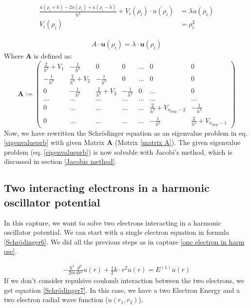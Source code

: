 \documentclass[10pt,a4paper]{article}
\begin{document}
\begin{align}
	\frac{u(\rho_i+h)-2u(\rho_i)+u(\rho_i-h)}{h^2}  + V_i(\rho_i) \cdot u(\rho_i) &= \lambda u(\rho_i) \label{Schrödinger5}\\
	V_i(\rho_i) &= \rho_i^2
\end{align}

\begin{align}
	A \cdot \mathbf{u}(\rho_i)  = \lambda \cdot \mathbf{u}(\rho_i) \label{eigenvalueprb}
\end{align}
Where $\mathbf{A}$ is defined as:
\begin{equation}
	\mathbf{A}:=  \left( \begin{array}{ccccccc} \frac{2}{h^2}+V_1 & -\frac{1}{h^2} & 0   & 0    & \dots  &0     & 0 \\
		-\frac{1}{h^2} & \frac{2}{h^2}+V_2 & -\frac{1}{h^2} & 0    & \dots  &0     &0 \\
		0   & -\frac{1}{h^2} & \frac{2}{h^2}+V_3 & -\frac{1}{h^2}  &0       &\dots & 0\\
		\dots  & \dots & \dots & \dots  &\dots      &\dots & \dots\\
		0   & \dots & \dots & \dots  &\dots       &\frac{2}{h^2}+V_{n_{\mathrm{step}}-2} & -\frac{1}{h^2}\\
		0   & \dots & \dots & \dots  &\dots       &-\frac{1}{h^2} & \frac{2}{h^2}+V_{n_{\mathrm{step}}-1}
		
	\end{array} \right)  \label{matrix A}
\end{equation} 
Now, we have rewritten the Schrödinger equation as an eigenvalue problem in eq. \eqref{eigenvalueprb} with given Matrix $\mathbf{A}$ (Matrix \ref{matrix A}). The given eigenvalue problem (eq. \eqref{eigenvalueprb}) is now solvable with Jacobi's method, which is discussed in section \ref{Jacobis method}.

\subsection{Two interacting electrons in a harmonic oscillator potential}

In this capture, we want to solve two electrons interacting in a harmonic oscillator potential.
We can start with a single electron equation in formula \ref{Schrödinger6}. We did all the previous steps as in capture  \ref{one electron in harm osc}. 

\begin{align}
	-\frac{\hbar^2}{2 m}  \frac{d^2}{dr^2} u(r)+ \frac{1}{2}k \cdot r^2 u(r)= E^{(1)} u(r) \label{Schrödinger6}
\end{align}
If we don't consider repulsive coulomb interaction between the two electrons, we get equation \ref{Schrödinger7}. In this case, we have a two Electron Energy and a two electron radial wave function ($u(r_1,r_2)$). 
\end{document}
